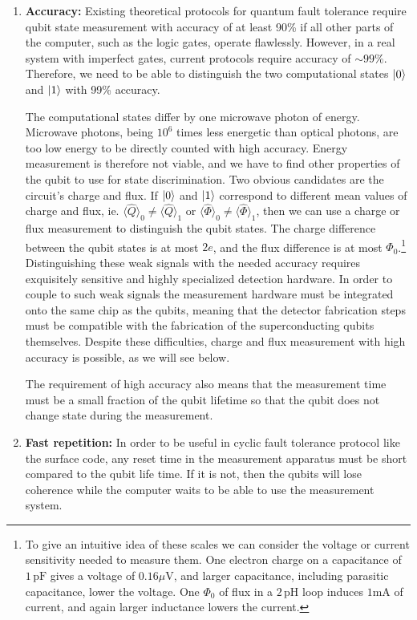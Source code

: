 \begin{enumerate}
\item \textbf{Accuracy:} Existing theoretical protocols for quantum fault tolerance require qubit state measurement with accuracy of at least 90\% if all other parts of the computer, such as the logic gates, operate flawlessly.
However, in a real system with imperfect gates, current protocols require accuracy of $\sim99\%$.
Therefore, we need to be able to distinguish the two computational states $|0\rangle$ and $|1\rangle$ with 99\% accuracy.

The computational states differ by one microwave photon of energy.
Microwave photons, being $10^6$ times less energetic than optical photons, are too low energy to be directly counted with high accuracy.
Energy measurement is therefore not viable, and we have to find other properties of the qubit to use for state discrimination.
Two obvious candidates are the circuit's charge and flux.
If $|0\rangle$ and $|1\rangle$ correspond to different mean values of charge and flux, ie. $\langle \hat{Q} \rangle_0 \neq \langle \hat{Q} \rangle_1$ or $\langle \hat{\Phi} \rangle_0 \neq \langle \hat{\Phi} \rangle_1$, then we can use a charge or flux measurement to distinguish the qubit states.
The charge difference between the qubit states is at most $2e$, and the flux difference is at most $\Phi_0$.\footnote{To give an intuitive idea of these scales we can consider the voltage or current sensitivity needed to measure them. One electron charge on a capacitance of $1\,\textrm{pF}$ gives a voltage of $0.16\mu\textrm{V}$, and larger capacitance, including parasitic capacitance, lower the voltage. One $\Phi_0$ of flux in a $2\,\textrm{pH}$ loop induces $1\textrm{mA}$ of current, and again larger inductance lowers the current.}
Distinguishing these weak signals with the needed accuracy requires exquisitely sensitive and highly specialized detection hardware.
In order to couple to such weak signals the measurement hardware must be integrated onto the same chip as the qubits, meaning that the detector fabrication steps must be compatible with the fabrication of the superconducting qubits themselves.
Despite these difficulties, charge and flux measurement with high accuracy is possible, as we will see below.

The requirement of high accuracy also means that the measurement time must be a small fraction of the qubit lifetime so that the qubit does not change state during the measurement.

\item \textbf{Fast repetition:} In order to be useful in cyclic fault tolerance protocol like the surface code, any reset time in the measurement apparatus must be short compared to the qubit life time. If it is not, then the qubits will lose coherence while the computer waits to be able to use the measurement system.


\end{enumerate}
